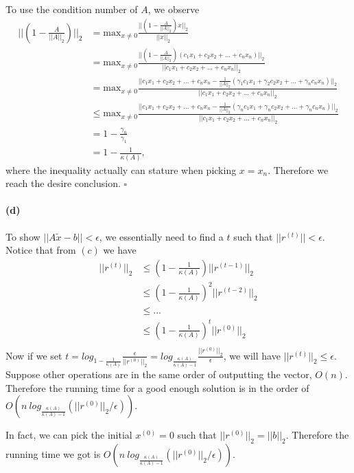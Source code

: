 \documentclass[12pt]{article}
\begin{document}
To use the condition number of $A$, we observe
\begin{align*}
\Big|\Big|\left(1 - \frac{A}{||A||_2}\right)\Big|\Big|_2 &= \text{max}_{x\neq0} \frac{\Big|\Big|\left(1 - \frac{A}{||A||_2}\right) x\Big|\Big|_2}{||x||_2}\\
& = \text{max}_{x\neq0} \frac{\Big|\Big|\left(1 - \frac{A}{||A||_2}\right) (c_1x_1 + c_2x_2 + ... + c_nx_n)\Big|\Big|_2}{||c_1x_1 + c_2x_2 + ... + c_nx_n||_2}\\
& = \text{max}_{x\neq0} \frac{\Big|\Big|c_1x_1 + c_2x_2 + ... + c_nx_n - \frac{1}{||A||_2}(\gamma_1c_1x_1 + \gamma_2c_2x_2 + ... + \gamma_nc_nx_n)\Big|\Big|_2}{||c_1x_1 + c_2x_2 + ... + c_nx_n||_2}\\
& \leq \text{max}_{x\neq0} \frac{\Big|\Big|c_1x_1 + c_2x_2 + ... + c_nx_n - \frac{1}{||A||_2}(\gamma_nc_1x_1 + \gamma_nc_2x_2 + ... + \gamma_nc_nx_n)\Big|\Big|_2}{||c_1x_1 + c_2x_2 + ... + c_nx_n||_2}\\
&= 1 - \frac{\gamma_n}{\gamma_1}\\
&= 1 - \frac{1}{\kappa(A)},
\end{align*}
where the inequality actually can stature when picking $x = x_n$. Therefore we reach the desire conclusion. $\square$

\paragraph{(d)} To show $||A\tilde{x} -b || < \epsilon$, we essentially need to find a $t$ such that $||r^{(t)}|| < \epsilon$. Notice that from $(c)$ we have 
\begin{align*}
||r^{(t)}||_2 &\leq \left(1 - \frac{1}{\kappa(A)}\right) ||r^{(t-1)}||_2 \\
&\leq \left(1 - \frac{1}{\kappa(A)}\right)^2 ||r^{(t-2)}||_2 \\
&\leq ...\\
&\leq \left(1 - \frac{1}{\kappa(A)}\right)^t ||r^{(0)}||_2 \\
\end{align*}
Now if we set $t = log_{1 - \frac{1}{\kappa(A)}}\frac{\epsilon}{||r^{(0)}||_2} = log_{\frac{\kappa(A)}{\kappa(A) - 1}}\frac{||r^{(0)}||_2}{\epsilon}$, we will have $||r^{(t)}||_2 \leq \epsilon$. Suppose other operations are in the same order of outputting the vector, $O(n)$. Therefore the running time for a good enough solution is in the order of $O(n\:log_{\frac{\kappa(A)}{\kappa(A) - 1}}(||r^{(0)}||_2/\epsilon))$. 

In fact, we can pick the initial $x^{(0)}=0$ such that $||r^{(0)}||_2 = ||b||_2$. Therefore the running time we got is $O(n\:log_{\frac{\kappa(A)}{\kappa(A) - 1}}(||r^{(0)}||_2/\epsilon))$.
\end{document}
